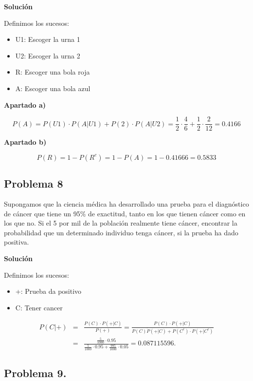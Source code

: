 \documentclass[
]{article}
\providecommand{\tightlist}{%
  \setlength{\itemsep}{0pt}\setlength{\parskip}{0pt}}
\begin{document}
\textbf{Solución}

Definimos los sucesos:

\begin{itemize}
\tightlist
\item
  U1: Escoger la urna 1
\item
  U2: Escoger la urna 2
\item
  R: Escoger una bola roja
\item
  A: Escoger una bola azul
\end{itemize}

\textbf{Apartado a)}

\[
P(A) = P(U1) \cdot P(A|U1) + P(2) \cdot P(A|U2) = \frac{1}{2}\cdot \frac{4}{6} + \frac{1}{2} \cdot \frac{2}{12} = 0.4166
\]

\textbf{Apartado b)}

\[
P(R) = 1 - P(R^c) = 1-P(A)= 1 - 0.41666 = 0.5833
\]

\hypertarget{problema-8}{%
\subsection{Problema 8}\label{problema-8}}

Supongamos que la ciencia médica ha desarrollado una prueba para el
diagnóstico de cáncer que tiene un 95\% de exactitud, tanto en los que
tienen cáncer como en los que no. Si el 5 por mil de la población
realmente tiene cáncer, encontrar la probabilidad que un determinado
individuo tenga cáncer, si la prueba ha dado positiva.

\textbf{Solución}

Definimos los sucesos:

\begin{itemize}
\tightlist
\item
  +: Prueba da positivo
\item
  C: Tener cancer
\end{itemize}

\[
\begin{eqnarray*}
P(C|+) &=& \frac{P(C) \cdot P(+|C)}{P(+)} =
\frac{P(C) \cdot P(+|C)}{P(C) \dot P(+|C) + P(C^c) \cdot P(+|C^c)} \\
&=&  \frac{\frac5{1000} \cdot 0.95}{\frac5{1000} \cdot 0.95 + \frac{995}{1000} \cdot 0.05} = 0.087115596.
\end{eqnarray*}
\]

\hypertarget{problema-9.}{%
\subsection{Problema 9.}\label{problema-9.}}
\end{document}
